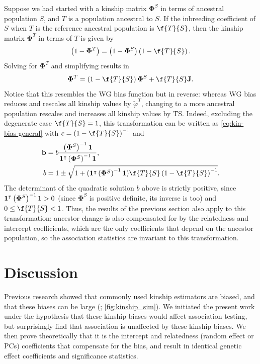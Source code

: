\documentclass[11pt]{article}
\newcommand{\kinMat}[1][T]{%
  \ensuremath{%
    \mathbf{\Phi}^{#1}
  }%
  \xspace%
}%
\begin{document}
Suppose we had started with a kinship matrix \kinMat[S] in terms of ancestral population $S$, and $T$ is a population ancestral to $S$.
If the inbreeding coefficient of $S$ when $T$ is the reference ancestral population is $\f{T}{S}$, then the kinship matrix \kinMat in terms of $T$ is given by \citep{ochoa_estimating_2021}
$$
\left( 1 - \kinMat \right)
=
\left( 1 - \kinMat[S] \right) \left( 1 - \f{T}{S} \right)
.
$$
Solving for \kinMat and simplifying results in
$$
\kinMat
=
\left( 1 - \f{T}{S} \right) \kinMat[S] + \f{T}{S} \mathbf{J}
.
$$
Notice that this resembles the WG bias function but in reverse: whereas WG bias reduces and rescales all kinship values by $\tilde{\varphi}^T$, changing to a more ancestral population rescales and increases all kinship values by \f{T}{S}.
Indeed, excluding the degenerate case $\f{T}{S} = 1$, this transformation can be written as \cref{eq:kin-bias-general} with
$c = \left( 1 - \f{T}{S} \right)^{-1}$ and
\begin{align*}
  \mathbf{b}
  &=
    b \frac{ \left( \kinMat[S] \right)^{-1} \mathbf{1} }{ \mathbf{1}^\intercal \left( \kinMat[S] \right)^{-1} \mathbf{1} }
  , \\
  b
  &=
    1 \pm \sqrt{1 + (\mathbf{1}^\intercal \left( \kinMat[S] \right)^{-1} \mathbf{1}) \f{T}{S} \left( 1 - \f{T}{S} \right)^{-1} }
.
\end{align*}
The determinant of the quadratic solution $b$ above is strictly positive, since $\mathbf{1}^\intercal \left( \kinMat[S] \right)^{-1} \mathbf{1} > 0$ (since \kinMat[S] is positive definite, its inverse is too) and $0 \le \f{T}{S} < 1$.
Thus, the results of the previous section also apply to this transformation: ancestor change is also compensated for by the relatedness and intercept coefficients, which are the only coefficients that depend on the ancestor population, so the association statistics are invariant to this transformation.

\section{Discussion}

Previous research showed that commonly used kinship estimators are biased, and that these biases can be large (\citet{ochoa_estimating_2021}; \cref{fig:kinship_sim}).
We initiated the present work under the hypothesis that these kinship biases would affect association testing, but surprisingly find that association is unaffected by these kinship biases.
We then prove theoretically that it is the intercept and relatedness (random effect or PCs) coefficients that compensate for the bias, and result in identical genetic effect coefficients and significance statistics.
\end{document}
